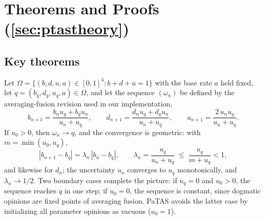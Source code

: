 



   





\section{Theorems and Proofs (\cref{sec:ptastheory})}\label{app:proof}
\subsection{Key theorems}
\begin{theorem}\label{thm:arithm}
Let $\Omega = \{(b,d,u,a) \in [0,1]^4 : b+d+u = 1\}$ with the base rate $a$ held fixed, let $q = (b_q, d_q, u_q, a) \in \Omega$, and let the sequence $(\omega_n)$ be defined by the averaging-fusion revision used in our implementation,
\[
b_{n+1} = \frac{b_n u_q + b_q u_n}{u_n + u_q}, \qquad
d_{n+1} = \frac{d_n u_q + d_q u_n}{u_n + u_q}, \qquad
u_{n+1} = \frac{2\, u_n u_q}{u_n + u_q}.
\]
If $u_0 > 0$, then $\omega_n \to q$, and the convergence is geometric: with $m = \min(u_0, u_q)$,
\[
|b_{n+1} - b_q| = \lambda_n\, |b_n - b_q|, \qquad
\lambda_n = \frac{u_q}{u_n + u_q} \;\leq\; \frac{u_q}{m + u_q} < 1,
\]
and likewise for $d_n$; the uncertainty $u_n$ converges to $u_q$ monotonically, and $\lambda_n \to 1/2$. Two boundary cases complete the picture: if $u_q = 0$ and $u_0 > 0$, the sequence reaches $q$ in one step; if $u_0 = 0$, the sequence is constant, since dogmatic opinions are fixed points of averaging fusion. PaTAS avoids the latter case by initializing all parameter opinions as vacuous ($u_0 = 1$).
\end{theorem}

